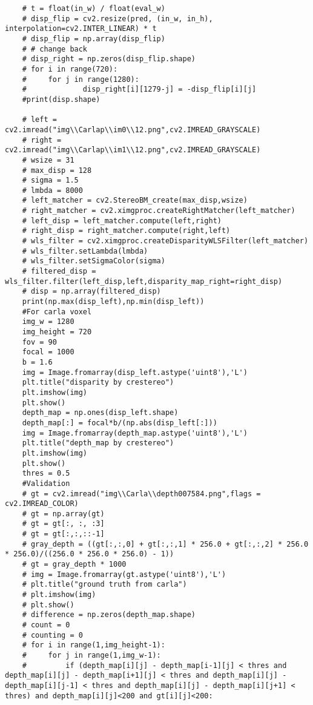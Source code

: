 \begin{lstlisting}
    # t = float(in_w) / float(eval_w)
    # disp_flip = cv2.resize(pred, (in_w, in_h), interpolation=cv2.INTER_LINEAR) * t
    # disp_flip = np.array(disp_flip)
    # # change back
    # disp_right = np.zeros(disp_flip.shape)
    # for i in range(720):
    #     for j in range(1280):
    #             disp_right[i][1279-j] = -disp_flip[i][j]
    #print(disp.shape)

    # left = cv2.imread("img\\Carlap\\im0\\12.png",cv2.IMREAD_GRAYSCALE)
    # right = cv2.imread("img\\Carlap\\im1\\12.png",cv2.IMREAD_GRAYSCALE)
    # wsize = 31
    # max_disp = 128
    # sigma = 1.5
    # lmbda = 8000
    # left_matcher = cv2.StereoBM_create(max_disp,wsize)
    # right_matcher = cv2.ximgproc.createRightMatcher(left_matcher)
    # left_disp = left_matcher.compute(left,right)
    # right_disp = right_matcher.compute(right,left)
    # wls_filter = cv2.ximgproc.createDisparityWLSFilter(left_matcher)
    # wls_filter.setLambda(lmbda)
    # wls_filter.setSigmaColor(sigma)
    # filtered_disp = wls_filter.filter(left_disp,left,disparity_map_right=right_disp)
    # disp = np.array(filtered_disp)
    print(np.max(disp_left),np.min(disp_left))
    #For carla voxel
    img_w = 1280
    img_height = 720
    fov = 90
    focal = 1000
    b = 1.6
    img = Image.fromarray(disp_left.astype('uint8'),'L')
    plt.title("disparity by crestereo")
    plt.imshow(img)
    plt.show()
    depth_map = np.ones(disp_left.shape)
    depth_map[:] = focal*b/(np.abs(disp_left[:]))
    img = Image.fromarray(depth_map.astype('uint8'),'L')
    plt.title("depth_map by crestereo")
    plt.imshow(img)
    plt.show()
    thres = 0.5
    #Validation
    # gt = cv2.imread("img\\Carla\\depth007584.png",flags = cv2.IMREAD_COLOR)
    # gt = np.array(gt)
    # gt = gt[:, :, :3]
    # gt = gt[:,:,::-1]
    # gray_depth = ((gt[:,:,0] + gt[:,:,1] * 256.0 + gt[:,:,2] * 256.0 * 256.0)/((256.0 * 256.0 * 256.0) - 1))
    # gt = gray_depth * 1000
    # img = Image.fromarray(gt.astype('uint8'),'L')
    # plt.title("ground truth from carla")
    # plt.imshow(img)
    # plt.show()
    # difference = np.zeros(depth_map.shape)
    # count = 0
    # counting = 0
    # for i in range(1,img_height-1):
    #     for j in range(1,img_w-1):
    #         if (depth_map[i][j] - depth_map[i-1][j] < thres and depth_map[i][j] - depth_map[i+1][j] < thres and depth_map[i][j] - depth_map[i][j-1] < thres and depth_map[i][j] - depth_map[i][j+1] < thres) and depth_map[i][j]<200 and gt[i][j]<200:

\end{lstlisting}
